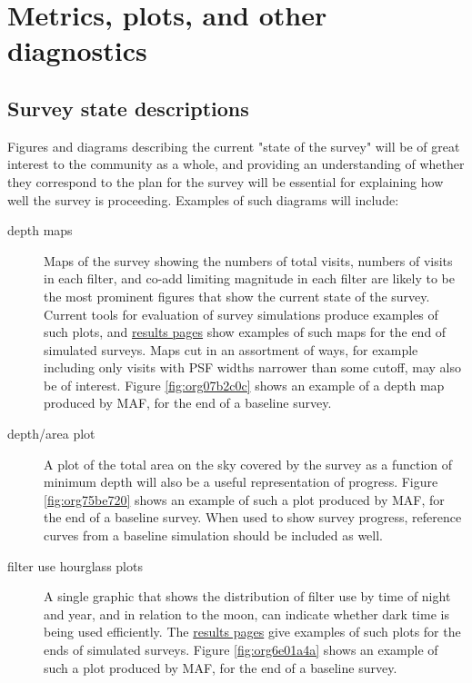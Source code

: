 \section{Metrics, plots, and other diagnostics}
\label{sec:org098aaeb}
\subsection{Survey state descriptions}
\label{sec:org5244b13}
Figures and diagrams describing the current "state of the survey" will be of great interest to the community as a whole, and providing an understanding of whether they correspond to the plan for the survey will be essential for explaining how well the survey is proceeding.
Examples of such diagrams will include:

\begin{description}
\item[{depth maps}] Maps of the survey showing the numbers of total visits, numbers of visits in each filter, and co-add limiting magnitude in each filter are likely to be the most prominent figures that show the current state of the survey. Current tools for evaluation of survey simulations produce examples of such plots, and \href{http://astro-lsst-01.astro.washington.edu:8081/allMetricResults?runId=392\#Basic\%20Maps}{results pages} show examples of such maps for the end of simulated surveys. Maps cut in an assortment of ways, for example including only visits with PSF widths narrower than some cutoff, may also be of interest. Figure \ref{fig:org07b2c0c} shows an example of a depth map produced by MAF, for the end of a baseline survey.
\item[{depth/area plot}] A plot of the total area on the sky covered by the survey as a function of minimum depth will also be a useful representation of progress. Figure \ref{fig:org75be720} shows an example of such a plot produced by MAF, for the end of a baseline survey. When used to show survey progress, reference curves from a baseline simulation should be included as well.
\item[{filter use hourglass plots}] A single graphic that shows the distribution of filter use by time of night and year, and in relation to the moon, can indicate whether dark time is being used efficiently. The \href{http://astro-lsst-01.astro.washington.edu:8081/allMetricResults?runId=392\#Hourglass}{results pages} give examples of such plots for the ends of simulated surveys. Figure \ref{fig:org6e01a4a} shows an example of such a plot produced by MAF, for the end of a baseline survey.

\end{description}
